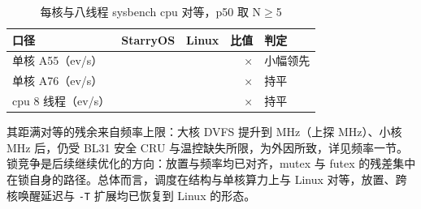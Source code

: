 \begin{table}[H]\centering\small
\begin{tabular}{@{}p{3.6cm}rrrl@{}}
\toprule
口径 & StarryOS & Linux & 比值 & 判定 \\
\midrule
单核 A55（ev/s） & \nAfive{} & \nAfiveLin{} & \nAfiveRatio{}× & 小幅领先 \\
单核 A76（ev/s） & \nAseven{} & \nAsevenLin{} & \nAsevenRatio{}× & 持平 \\
cpu 8 线程（ev/s） & \nCpuTEight{} & \nCpuTEightLin{} & \nCpuTEightRatio{}× & 持平 \\
\bottomrule
\end{tabular}
\caption{每核与八线程 sysbench cpu 对等，p50 取 N$\geq$5}
\end{table}

其距满对等的残余来自频率上限：大核 DVFS 提升到 \nDvfsAseven{} MHz（上探 \nDvfsAsevenTop{} MHz）、小核 \nDvfsAfive{} MHz 后，仍受 BL31 安全 CRU 与温控缺失所限，为外因所致，详见频率一节。锁竞争是后续继续优化的方向：放置与频率均已对齐，mutex 与 futex 的残差集中在锁自身的路径。总体而言，调度在结构与单核算力上与 Linux 对等，放置、跨核唤醒延迟与 \texttt{-T} 扩展均已恢复到 Linux 的形态。
